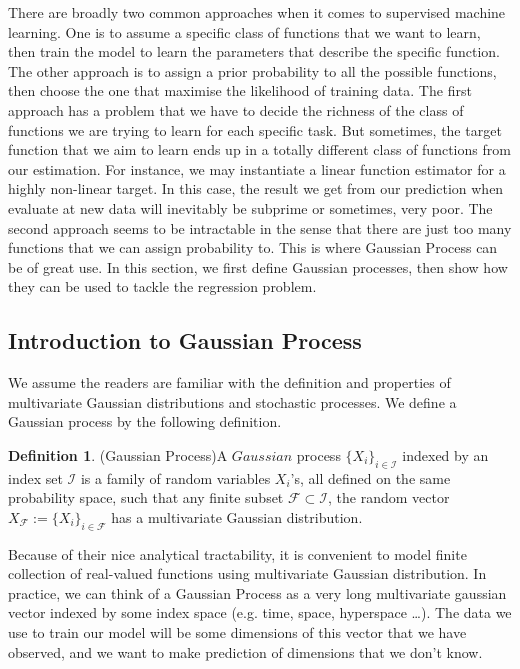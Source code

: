 \documentclass[11pt,a4paper]{article}
\theoremstyle{definition}
\newtheorem{definition}[theorem]{Definition}
\numberwithin{equation}{section}
\begin{document}
There are broadly two common approaches when it comes to supervised machine learning. One is to assume a specific class of functions that we want to learn, then train the model to learn the parameters that describe the specific function. The other approach is to assign a prior probability to all the possible functions, then choose the one that maximise the likelihood of training data. The first approach has a problem that we have to decide the richness of the class of functions we are trying to learn for each specific task. But sometimes, the target function that we aim to learn ends up in a totally different class of functions from our estimation. For instance, we may instantiate a linear function estimator for a highly non-linear target. In this case, the result we get from our prediction when evaluate at new data will inevitably be subprime or sometimes, very poor. The second approach seems to be intractable in the sense that there are just too many functions that we can assign probability to. This is where Gaussian Process can be of great use. In this section, we first define Gaussian processes, then show how they can be used to tackle the regression problem. 

\subsection{Introduction to Gaussian Process}

We assume the readers are familiar with the definition and properties of multivariate Gaussian distributions and stochastic processes. We define a Gaussian process by the following definition.

\begin{definition}(Gaussian Process)\label{def:gp}
	A $Gaussian$ process $\{X_i\}_{i\in \mathcal{I}}$ indexed by an index set $\mathcal{I}$ is a family of random variables $X_i$'s, all defined on the same probability space, such that any finite subset $\mathcal{F}\subset\mathcal{I}$, the random vector $X_{\mathcal{F}} := \{X_i\}_{i\in \mathcal{F}}$ has a multivariate Gaussian distribution.\cite[Lalley]{Lalley}
\end{definition}

Because of their nice analytical tractability, it is convenient to model finite collection of real-valued functions using  multivariate Gaussian distribution. In practice, we can think of a Gaussian Process as a very long multivariate gaussian vector indexed by some index space (e.g. time, space, hyperspace \ldots). The data we use to train our model will be some dimensions of this vector that we have observed, and we want to make prediction of dimensions that we don't know. 
\end{document}
